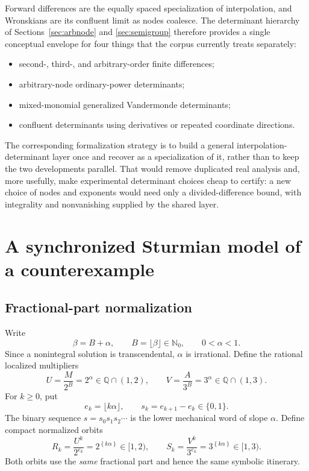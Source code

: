 \documentclass[11pt,oneside]{article}
\theoremstyle{definition}
\theoremstyle{remark}
\newcommand{\Nzero}{\mathbb N_0}
\newcommand{\Q}{\mathbb Q}
\newcommand{\fract}[1]{\left\{#1\right\}}
\newcommand{\lean}[1]{\texttt{\detokenize{#1}}}
\begin{document}
Forward differences are the equally spaced specialization of interpolation, and Wronskians
are its confluent limit as nodes coalesce.  The determinant hierarchy of
Sections~\ref{sec:arbnode} and \ref{sec:semigroup} therefore provides a single conceptual
envelope for four things that the corpus currently treats separately:

\begin{itemize}
\item second-, third-, and arbitrary-order finite differences;
\item arbitrary-node ordinary-power determinants;
\item mixed-monomial generalized Vandermonde determinants;
\item confluent determinants using derivatives or repeated coordinate directions.
\end{itemize}

The corresponding formalization strategy is to build a general
interpolation-determinant layer once and recover \lean{HigherDifference} as a specialization
of it, rather than to keep the two developments parallel.  That would remove duplicated real
analysis and, more usefully, make experimental determinant choices cheap to certify: a new
choice of nodes and exponents would need only a divided-difference bound, with integrality
and nonvanishing supplied by the shared layer.

\section{A synchronized Sturmian model of a counterexample}
\label{sec:sturmian}

\subsection{Fractional-part normalization}

Write
\[
  \beta=B+\alpha,
  \qquad B=\lfloor\beta\rfloor\in\Nzero,
  \qquad 0<\alpha<1.
\]
Since a nonintegral solution is transcendental, $\alpha$ is irrational.  Define the rational
localized multipliers
\begin{equation}\label{eq:UV}
  U=\frac{M}{2^B}=2^\alpha\in\Q\cap(1,2),
  \qquad
  V=\frac{A}{3^B}=3^\alpha\in\Q\cap(1,3).
\end{equation}
For $k\ge0$, put
\[
  e_k=\lfloor k\alpha\rfloor,
  \qquad
  s_k=e_{k+1}-e_k\in\{0,1\}.
\]
The binary sequence $s=s_0s_1s_2\cdots$ is the lower mechanical word of slope $\alpha$.
Define compact normalized orbits
\begin{equation}\label{eq:normalized-orbits}
  R_k=\frac{U^k}{2^{e_k}}=2^{\fract{k\alpha}}\in[1,2),
  \qquad
  S_k=\frac{V^k}{3^{e_k}}=3^{\fract{k\alpha}}\in[1,3).
\end{equation}
Both orbits use the \emph{same} fractional part and hence the same symbolic itinerary.
\end{document}
